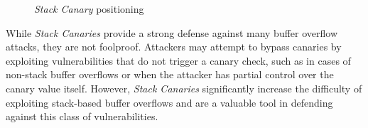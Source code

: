 \begin{figure}
  \centering
  \def\stackalignment{r} %
  {\scriptsize \parbox[t]{\linewidth}{}}
  \caption{\textit{Stack Canary} positioning}
  \label{fig:canary}
\end{figure}

While \textit{Stack Canaries} provide a strong defense against many buffer overflow
attacks, they are not foolproof. Attackers may attempt to bypass canaries by exploiting
vulnerabilities that do not trigger a canary check, such as in cases of non-stack
buffer overflows or when the attacker has partial control over the canary value
itself. However, \textit{Stack Canaries} significantly increase the difficulty of
exploiting stack-based buffer overflows and are a valuable tool in defending against
this class of vulnerabilities.


